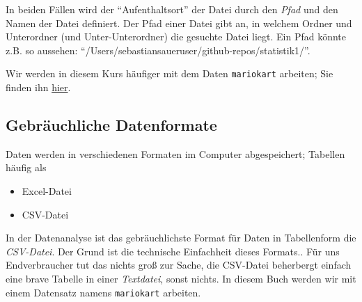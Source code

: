 \documentclass[
  letterpaper,
  twoside,
  open=any]{scrbook}
\providecommand{\tightlist}{%
  \setlength{\itemsep}{0pt}\setlength{\parskip}{0pt}}\usepackage{longtable,booktabs,array}
\theoremstyle{definition}
\theoremstyle{definition}
\theoremstyle{definition}
\theoremstyle{remark}
\begin{document}
In beiden Fällen wird der \enquote{Aufenthaltsort} der Datei durch den
\emph{Pfad} und den Namen der Datei definiert. Der Pfad einer Datei gibt
an, in welchem Ordner und Unterordner (und Unter-Unterordner) die
gesuchte Datei liegt. Ein Pfad könnte z.B. so aussehen:
\enquote{/Users/sebastiansaueruser/github-repos/statistik1/}.

\begin{tcolorbox}[enhanced jigsaw, colframe=quarto-callout-note-color-frame, arc=.35mm, leftrule=.75mm, bottomtitle=1mm, titlerule=0mm, colbacktitle=quarto-callout-note-color!10!white, breakable, bottomrule=.15mm, colback=white, left=2mm, rightrule=.15mm, opacityback=0, toptitle=1mm, toprule=.15mm, opacitybacktitle=0.6, title=\textcolor{quarto-callout-note-color}{\faInfo}\hspace{0.5em}{Hinweis}, coltitle=black]

Wir werden in diesem Kurs häufiger mit dem Daten \texttt{mariokart}
arbeiten; Sie finden ihn
\href{https://vincentarelbundock.github.io/Rdatasets/csv/openintro/mariokart.csv}{hier}.\footnotemark{}

\end{tcolorbox}


\subsection{Gebräuchliche
Datenformate}\label{gebruxe4uchliche-datenformate}

Daten werden in verschiedenen Formaten im Computer abgespeichert;
Tabellen häufig als

\begin{itemize}
\tightlist
\item
  Excel-Datei
\item
  CSV-Datei
\end{itemize}

In der Datenanalyse ist das gebräuchlichste Format für Daten in
Tabellenform die \emph{CSV-Datei}. Der Grund ist die technische
Einfachheit dieses Formats.. Für uns Endverbraucher tut das nichts groß
zur Sache, die CSV-Datei beherbergt einfach eine brave Tabelle in einer
\emph{Textdatei}, sonst nichts. In diesem Buch werden wir mit einem
Datensatz namens \texttt{mariokart} arbeiten.
\end{document}
